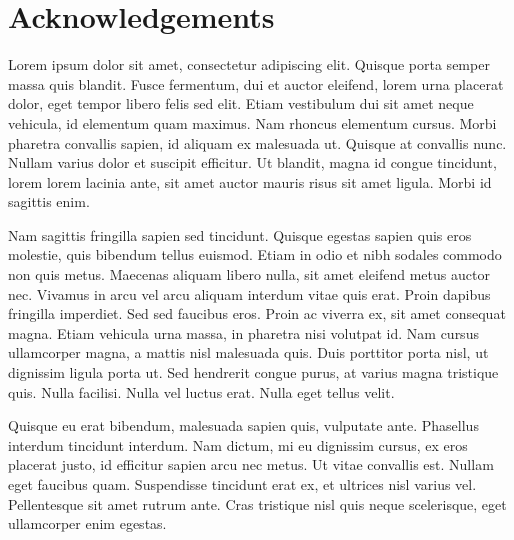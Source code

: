 \chapter*{Acknowledgements}


Lorem ipsum dolor sit amet, consectetur adipiscing elit. Quisque porta semper massa quis blandit. Fusce fermentum, dui et auctor eleifend, lorem urna placerat dolor, eget tempor libero felis sed elit. Etiam vestibulum dui sit amet neque vehicula, id elementum quam maximus. Nam rhoncus elementum cursus. Morbi pharetra convallis sapien, id aliquam ex malesuada ut. Quisque at convallis nunc. Nullam varius dolor et suscipit efficitur. Ut blandit, magna id congue tincidunt, lorem lorem lacinia ante, sit amet auctor mauris risus sit amet ligula. Morbi id sagittis enim.

Nam sagittis fringilla sapien sed tincidunt. Quisque egestas sapien quis eros molestie, quis bibendum tellus euismod. Etiam in odio et nibh sodales commodo non quis metus. Maecenas aliquam libero nulla, sit amet eleifend metus auctor nec. Vivamus in arcu vel arcu aliquam interdum vitae quis erat. Proin dapibus fringilla imperdiet. Sed sed faucibus eros. Proin ac viverra ex, sit amet consequat magna. Etiam vehicula urna massa, in pharetra nisi volutpat id. Nam cursus ullamcorper magna, a mattis nisl malesuada quis. Duis porttitor porta nisl, ut dignissim ligula porta ut. Sed hendrerit congue purus, at varius magna tristique quis. Nulla facilisi. Nulla vel luctus erat. Nulla eget tellus velit.

Quisque eu erat bibendum, malesuada sapien quis, vulputate ante. Phasellus interdum tincidunt interdum. Nam dictum, mi eu dignissim cursus, ex eros placerat justo, id efficitur sapien arcu nec metus. Ut vitae convallis est. Nullam eget faucibus quam. Suspendisse tincidunt erat ex, et ultrices nisl varius vel. Pellentesque sit amet rutrum ante. Cras tristique nisl quis neque scelerisque, eget ullamcorper enim egestas. 

